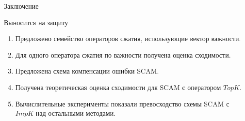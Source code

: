 \documentclass{beamer}
\begin{document}

\begin{frame}{Заключение}
    \begin{block}{Выносится на защиту}
    \begin{enumerate}
        \item Предложено семейство операторов сжатия, использующие вектор важности.
        \item Для одного оператора сжатия по важности получена оценка сходимости.
        \item Предложена схема компенсации ошибки SCAM.
        \item Получена теоретическая оценка сходимости для SCAM с оператором $TopK$.
        \item Вычислительные эксперименты показали превосходство схемы SCAM с $ImpK$ над остальными методами.
    \end{enumerate}
    \end{block}

\end{frame}

\end{document}
